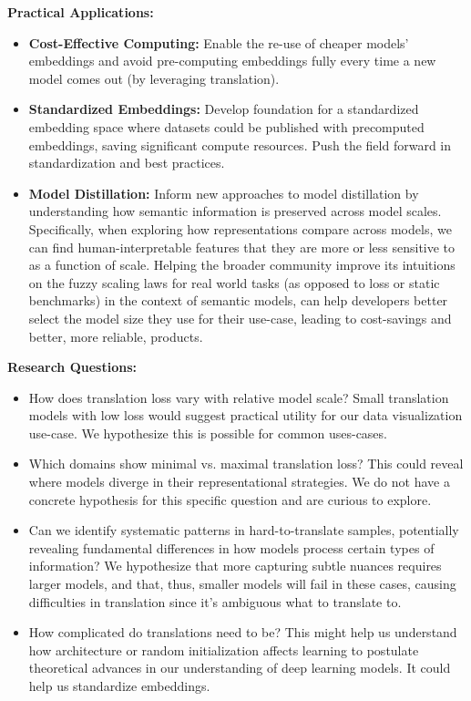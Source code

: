 \documentclass[9pt,letterpaper]{article}
\begin{document}
\textbf{Practical Applications:}
\begin{itemize}
    \item \textbf{Cost-Effective Computing:} Enable the re-use of cheaper models' embeddings and avoid pre-computing embeddings fully every time a new model comes out (by leveraging translation).
    \item \textbf{Standardized Embeddings:} Develop foundation for a standardized embedding space where datasets could be published with precomputed embeddings, saving significant compute resources. Push the field forward in standardization and best practices.
    \item \textbf{Model Distillation:} Inform new approaches to model distillation by understanding how semantic information is preserved across model scales. Specifically, when exploring how representations compare across models, we can find human-interpretable features that they are more or less sensitive to as a function of scale. Helping the broader community improve its intuitions on the fuzzy scaling laws for real world tasks (as opposed to loss or static benchmarks) in the context of semantic models, can help developers better select the model size they use for their use-case, leading to cost-savings and better, more reliable, products.
\end{itemize}

\textbf{Research Questions:}
\begin{itemize}
    \item How does translation loss vary with relative model scale? Small translation models with low loss would suggest practical utility for our data visualization use-case. We hypothesize this is possible for common uses-cases.
    \item Which domains show minimal vs. maximal translation loss? This could reveal where models diverge in their representational strategies. We do not have a concrete hypothesis for this specific question and are curious to explore.
    \item Can we identify systematic patterns in hard-to-translate samples, potentially revealing fundamental differences in how models process certain types of information? We hypothesize that more capturing subtle nuances requires larger models, and that, thus, smaller models will fail in these cases, causing difficulties in translation since it's ambiguous what to translate to.
    \item How complicated do translations need to be? This might help us understand how architecture or random initialization affects learning to postulate theoretical advances in our understanding of deep learning models. It could help us standardize embeddings.
\end{itemize}
\end{document}
